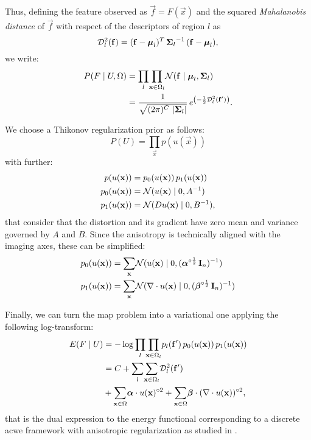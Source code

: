 Thus, defining the feature observed as $\vec{f}=F(\vec{x})$ and
the squared \emph{Mahalanobis distance} of $\vec{f}$ with respect
of the descriptors of region $l$ as
\begin{equation}
\mdist{f}{l} = (\vec{f} - \boldsymbol{\mu}_l)^T \, {\boldsymbol{\Sigma}_l}^{-1} \, (\vec{f} - \boldsymbol{\mu}_l),
\end{equation}
we write:
\begin{align}
P( F \mid U, \Omega ) &= \underset{l}{\prod} \underset{\vec{x} \in \Omega_l}{\prod}
\mathcal{N} ( \vec{f} \mid \boldsymbol{\mu}_l, \boldsymbol{\Sigma}_{l} ) \notag\\
&= \frac{1}{ \sqrt{(2\pi)^{C}\,\left|\boldsymbol{\Sigma}_{l}\right|}}\,{e^{\left(-\frac{1}{2}
\mdist{f'}{l} \right)}}.
\label{eq:pdf}
\end{align}

We choose a Thikonov regularization prior as follows:
\begin{equation*}
P(U) = \underset{\vec{x}}{\prod} p(u(\vec{x}))
\end{equation*}
with further:
\begin{align*}
p(u(\vec{x})) &= p_0(u(\vec{x})) \, p_1(u(\vec{x})) \notag\\
p_0(u(\vec{x})) &= \mathcal{N}( u(\vec{x}) \mid 0, A^{-1}) \notag\\
p_1(u(\vec{x})) &= \mathcal{N}( Du(\vec{x}) \mid 0, B^{-1}),
\end{align*}
that consider that the distortion and its gradient have zero
mean and variance governed by $A$ and $B$. Since the anisotropy
is technically aligned with the imaging axes, these can
be simplified:
\begin{align}
p_0(u(\vec{x})) &= \underset{\vec{x}}{\sum} \mathcal{N}( u(\vec{x}) \mid 0, (\boldsymbol{\alpha}^{\circ\frac12}\,\vec{I}_n)^{-1}) \notag\\
p_1(u(\vec{x})) &= \underset{\vec{x}}{\sum} \mathcal{N}( \nabla \cdot u(\vec{x}) \mid 0, (\boldsymbol{\beta}^{\circ\frac12}\,\vec{I}_n)^{-1})
\label{eq:priors}
\end{align}

Finally, we can turn the \gls{map} problem into
a variational one
applying the following log-transform:
\begin{align}
E(F \mid U) &= -\log \underset{l}{\prod}
\underset{\vec{x} \in \Omega_l}{\prod}
p_l( \vec{f}')\,p_0( u(\vec{x}))\,p_1( u(\vec{x})) \notag\\
&= C + \underset{l}{\sum}
\underset{\vec{x} \in \Omega_l}{\sum}
\mdist{f'}{l} \notag\\
&+ \underset{\vec{x} \in \Omega}{\sum} \boldsymbol{\alpha} \cdot u(\vec{x})^{\circ2}
+ \underset{\vec{x} \in \Omega}{\sum} \boldsymbol{\beta} \cdot (\nabla \cdot u(\vec{x}))^{\circ2},
\label{eq:energy}
\end{align}
that is the dual expression to the energy functional corresponding
to a discrete \gls*{acwe} framework \citep{chan_active_2001}
with anisotropic regularization as studied in
\citep{nagel_investigation_1986}.

